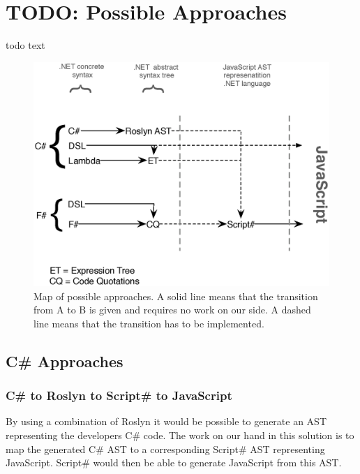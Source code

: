 \section{TODO: Possible Approaches} %
\label{sec:possible_approaches}
	todo text

	\begin{figure}[H]
		\begin{center}
			\centerline{\includegraphics[width=14cm]{resources/images/approachComparison.eps}}
		\end{center}
		\caption{Map of possible approaches. A solid line means that the transition from A to B is given and requires no work on our side. A dashed line means that the transition has to be implemented.}
		\label{approachMap}
	\end{figure}


	\subsection{C\# Approaches} %
	\label{sub:csharp_approaches}
		
		\subsubsection{C\# to Roslyn to Script\# to JavaScript} %
		\label{ssub:c_to_roslyn_to_script_to_javascript}
			By using a combination of Roslyn it would be possible to generate an AST representing the developers C\# code. The work on our hand in this solution is to map the generated C\# AST to a corresponding Script\# AST representing JavaScript. Script\# would then be able to generate JavaScript from this AST.

